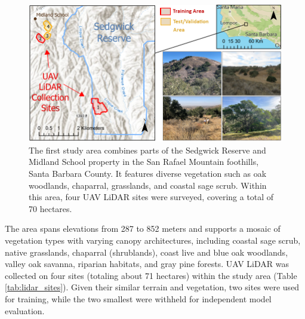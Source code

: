 \documentclass[remotesensing,article,submit,pdftex,moreauthors]{Definitions/mdpi}
\begin{document}
\begin{figure}%
  \centering
  \includegraphics[width=1\linewidth]{manuscript/figures/Sedgwick_Reserve_Study_Area.png}
    \caption{The first study area combines parts of the Sedgwick Reserve and Midland School property in the San Rafael Mountain foothills, Santa Barbara County. It features diverse vegetation such as oak woodlands, chaparral, grasslands, and coastal sage scrub. Within this area, four UAV LiDAR sites were surveyed, covering a total of 70 hectares.}
  \label{fig:sedgwick_study_area}
\end{figure}

The area spans elevations from 287 to 852 meters and supports a mosaic of vegetation types with varying canopy architectures, including coastal sage scrub, native grasslands, chaparral (shrublands), coast live and blue oak woodlands, valley oak savanna, riparian habitats, and gray pine forests. UAV LiDAR was collected on four sites (totaling about 71 hectares) within the study area (Table \ref{tab:lidar_sites}). Given their similar terrain and vegetation, two sites were used for training, while the two smallest were withheld for independent model evaluation.


\end{document}
